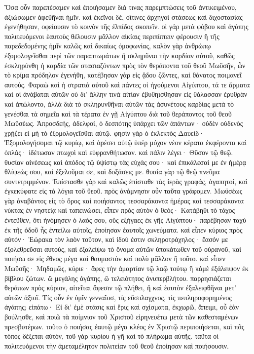 Ὅσα οὖν παρεπέσαμεν καὶ ἐποιήσαμεν διά τινας παρεμπτώσεις τοῦ ἀντικειμένου, ἀξιώσωμεν ἀφεθῆναι ἡμῖν. καὶ ἐκεῖνοι δέ, οἵτινες ἀρχηγοὶ στάσεως καὶ διχοστασίας ἐγενήθησαν, οφείουσιν τὸ κοινὸν τῆς ἐλπίδος σκοπεῖν. οἱ γάρ μετὰ φόβου καὶ ἀγάπης πολιτευόμενοι ἑαυτοὺς θέλουσιν μᾶλλον αἰκίαις περιπίπτειν φέρουσιν ἢ τῆς παρεδεδομένης ἡμῖν καλῶς καὶ δικαίως ὁμοφωνίας, καλὸν γὰρ ἀνθρώπῳ ἐξομολογεῖσθαι περὶ τῶν παραπτωμάτων ἢ σκληρῦναι τὴν καρδίαν αὐτοῦ, καθῶς ἐσκληρύνθη ἡ καρδία τῶν στασιαζόντων πρὸς τὸν θεράποντα τοῦ θεοῦ Μωϋσῆν, ὧν τὸ κρίμα πρόδηλον ἐγενήθη, κατέβησαν γὰρ εἰς ᾅδου ζῶντες, καὶ θάνατος ποιμανεῖ αυτούς. Φαραὼ καὶ ἡ στρατιὰ αὐτοῦ καὶ πάντες οἱ ἡγούμενοι Αἰγύπτου, τά τε ἅρματα καὶ οἱ ἀνάβαται αὐτῶν οὐ δι’ ἄλλην τινὰ αἰτίαν ἐβυθηισθησαν εἰς θάλασσαν ἐρυθρὰν καὶ ἀπώλοντο, ἀλλὰ διὰ τὸ σκληρυνθῆναι αὐτῶν τὰς ἀσυνέτους καρδίας μετὰ τὸ γενέσθαι τὰ σημεῖα καὶ τὰ τέρατα ἐν γῇ Αἰγύπτου διὰ τοῦ θεράποντος τοῦ θεοῦ Μωϋσέως.
Ἀπροσδεής, ἀδελφοί, ὁ δεσπότης ὑπάρχει τῶν ἁπάντων· οὐδὲν οὐδενὸς χρῄζει εἰ μὴ τὸ ἐξομολογεῖσθαι αὐτῷ. φησὶν γὰρ ὁ ἐκλεκτὸς Δαυείδ· Ἐξομολογήσομαι τῷ κυρίῳ, καὶ ἀρέσει αὐτῷ ὑπέρ μόχον νέον κέρατα ἐκφέροντα καὶ ὁπλάς· ἰδέτωσαν πτωχοὶ καὶ εὐφρανθήτωσαν. καὶ πάλιν λέγει· Θῦσον τῷ θεῷ. θυσίαν αἰνέσεως καὶ ἀπόδος τῷ ὑψίστῳ τὰς εὐχάς σου· καὶ ἐπικάλεσαί με ἐν ἡμέρᾳ θλίψεώς σου, καὶ ἐξελοῦμαι σε, καὶ δοξάσεις με. θυσία γὰρ τῷ θεῷ πνεῦμα συντετριμμένον.
Ἐπίστασθε γάρ καὶ καλῶς ἐπίσταθε τὰς ἱερὰς γραφάς, ἀγαπητοί, καὶ ἐγκεκύφατε εἰς τὰ λόγια τοῦ θεοῦ. πρὸς ἀνάμνησιν οὖν ταῦτα γράφομεν. Μωϋσέως γὰρ ἀναβάντος εἰς τὸ ὄρος καὶ ποιήσαντος τεσσαράκοντα ἡμέρας καὶ τεσσαράκοντα νύκτας ἐν νηστείᾳ καὶ ταπεινώσει, εἶπεν πρὸς αὐτὸν ὁ θεός· Κατάβηθι τὸ τάχος ἐντεῦθεν, ὅτι ἠνόμησεν ὁ λαός σου, οὓς εξήγαες ἐκ γῆς Αἰγύπτου· παρέβησαν ταχὺ ἐκ τῆς ὁδοῦ ἧς ἐντείλω αὐτοῖς, ἐποίησαν ἑαυτοῖς χωνεύματα. καὶ εἶπεν κύριος πρὸς αὐτόν· Ἑώρακα τὸν λαὸν τοῦτον, καὶ ἰδού ἐστιν σκληροτράχηλος· ἔασόν με ἐξολεθρεῦσαι αυτούς, καὶ ἐξαλείψω τὸ ὄνομα αὐτῶν ὑποκάτωθεν τοῦ οὐρανοῦ, καὶ ποιήσω σε εἰς ἔθνος μέγα καὶ θαυμαστὸν καὶ πολὺ μᾶλλον ἢ τοῦτο. καὶ εἶπεν Μωϋσῆς· Μηδαμῶς, κύριε· ἄφες τὴν ἁμαρτίαν τῷ λαῷ τούτῳ ἢ κἀμὲ ἐξάλειψον ἐκ βίβλου ζώτων. ὢ μεγάλης ἀγάπης, ὢ τελειότητος ἀνυπερβλήτου. παρρησιάζεται θεράπων πρὸς κύριον, αἰτεῖται ἄφεσιν τῷ πλήθει, ἢ καὶ ἑαυτὸν ἐξαλειφθῆναι μετ’ αὐτῶν ἀξιοῖ.
Τίς οὖν ἐν ὑμῖν γενναῖοσ, τίς εὔσπλαγχνος, τίς πεπληροφορημένος ἀγάπης; εἰπάτω· Εἰ δι’ ἐμὲ στάσις καὶ ἔρις καὶ σχίσματα, ἐκχωρῶ, ἄπειμι, οὗ ἐὰν βούλησθε, καὶ ποιῶ τὰ ποίμνιον τοῦ Χριστοῦ εἰρηνευέτω μετὰ τῶν καθεσταμένων πρεσβυτέρων. τοῦτο ὁ ποιήσας ἑαυτῷ μέγα κλέος ἐν Χριστῷ περιποιήσεται, καὶ πᾶς τόπος δέξεται αὐτόν, τοῦ γὰρ κυρίου ἡ γῆ καὶ τὸ πλήρωμα αὐτῆς. ταῦτα οἱ πολιτευόμενοι τὴν ἀμεταμέλητον πολιτείαν τοῦ θεοῦ ἐποίησαν καὶ ποιήσουσιν.

